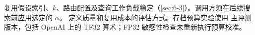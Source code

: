 复用假设索引、$k$、路由配置及查询工作负载稳定（\cref{sec:6-3}）。调用方须在后续搜索前应用选定的 $\alpha$。 定义质量和复用成本的评估方式。存档预算实验使用 主评测版本，包括 OpenAI 上的 TF32 算术；FP32 敏感性检查未重新执行预算校准。
